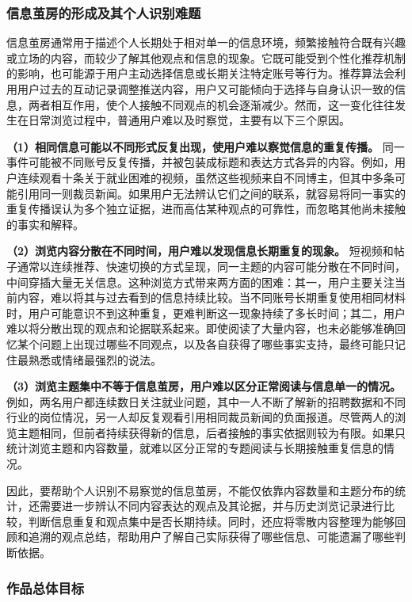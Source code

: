 \subsubsection{信息茧房的形成及其个人识别难题}\label{section:1.1.2}

信息茧房通常用于描述个人长期处于相对单一的信息环境，频繁接触符合既有兴趣或立场的内容，而较少了解其他观点和信息的现象。它既可能受到个性化推荐机制的影响，也可能源于用户主动选择信息或长期关注特定账号等行为。推荐算法会利用用户过去的互动记录调整推送内容，用户又可能倾向于选择与自身认识一致的信息，两者相互作用，使个人接触不同观点的机会逐渐减少。然而，这一变化往往发生在日常浏览过程中，普通用户难以及时察觉，主要有以下三个原因。

\textbf{（1）相同信息可能以不同形式反复出现，使用户难以察觉信息的重复传播。} 同一事件可能被不同账号反复传播，并被包装成标题和表达方式各异的内容。例如，用户连续观看十条关于就业困难的视频，虽然这些视频来自不同博主，但其中多条可能引用同一则裁员新闻。如果用户无法辨认它们之间的联系，就容易将同一事实的重复传播误认为多个独立证据，进而高估某种观点的可靠性，而忽略其他尚未接触的事实和解释。

\textbf{（2）浏览内容分散在不同时间，用户难以发现信息长期重复的现象。} 短视频和帖子通常以连续推荐、快速切换的方式呈现，同一主题的内容可能分散在不同时间，中间穿插大量无关信息。这种浏览方式带来两方面的困难：其一，用户主要关注当前内容，难以将其与过去看到的信息持续比较。当不同账号长期重复使用相同材料时，用户可能意识不到这种重复，更难判断这一现象持续了多长时间；其二，用户难以将分散出现的观点和论据联系起来。即使阅读了大量内容，也未必能够准确回忆某个问题上出现过哪些不同观点，以及各自获得了哪些事实支持，最终可能只记住最熟悉或情绪最强烈的说法。

\textbf{（3）浏览主题集中不等于信息茧房，用户难以区分正常阅读与信息单一的情况。} 例如，两名用户都连续数日关注就业问题，其中一人不断了解新的招聘数据和不同行业的岗位情况，另一人却反复观看引用相同裁员新闻的负面报道。尽管两人的浏览主题相同，但前者持续获得新的信息，后者接触的事实依据则较为有限。如果只统计浏览主题和内容数量，就难以区分正常的专题阅读与长期接触重复信息的情况。

因此，要帮助个人识别不易察觉的信息茧房，不能仅依靠内容数量和主题分布的统计，还需要进一步辨认不同内容表达的观点及其论据，并与历史浏览记录进行比较，判断信息重复和观点集中是否长期持续。同时，还应将零散内容整理为能够回顾和追溯的观点总结，帮助用户了解自己实际获得了哪些信息、可能遗漏了哪些判断依据。

\subsubsection{作品总体目标}\label{section:1.1.3}

